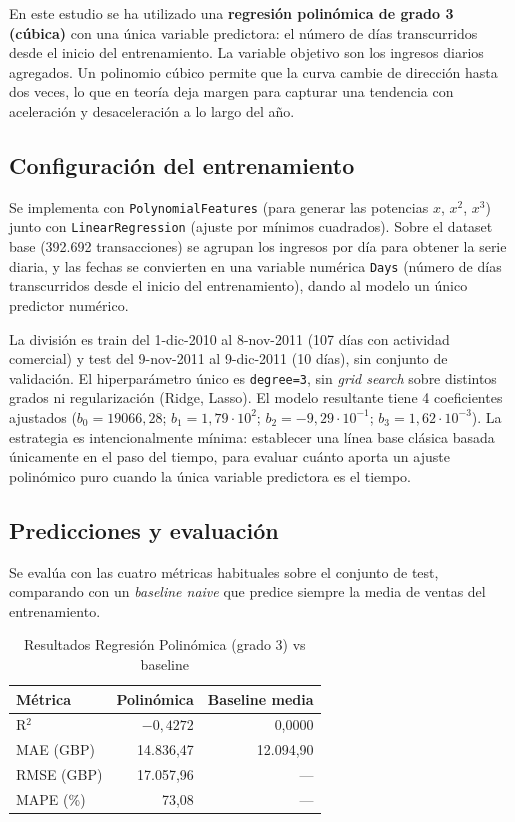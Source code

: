 \documentclass[11pt,a4paper]{article}
\begin{document}
En este estudio se ha utilizado una \textbf{regresión polinómica de grado 3 (cúbica)} con una única variable predictora: el número de días transcurridos desde el inicio del entrenamiento. La variable objetivo son los ingresos diarios agregados. Un polinomio cúbico permite que la curva cambie de dirección hasta dos veces, lo que en teoría deja margen para capturar una tendencia con aceleración y desaceleración a lo largo del año.

\subsection{Configuración del entrenamiento}

Se implementa con \texttt{PolynomialFeatures} (para generar las potencias $x$, $x^2$, $x^3$) junto con \texttt{LinearRegression} (ajuste por mínimos cuadrados). Sobre el dataset base (392.692 transacciones) se agrupan los ingresos por día para obtener la serie diaria, y las fechas se convierten en una variable numérica \texttt{Days} (número de días transcurridos desde el inicio del entrenamiento), dando al modelo un único predictor numérico.

La división es train del 1-dic-2010 al 8-nov-2011 (107 días con actividad comercial) y test del 9-nov-2011 al 9-dic-2011 (10 días), sin conjunto de validación. El hiperparámetro único es \texttt{degree=3}, sin \textit{grid search} sobre distintos grados ni regularización (Ridge, Lasso). El modelo resultante tiene 4 coeficientes ajustados ($b_0 = 19066{,}28$; $b_1 = 1{,}79\cdot10^{2}$; $b_2 = -9{,}29\cdot10^{-1}$; $b_3 = 1{,}62\cdot10^{-3}$). La estrategia es intencionalmente mínima: establecer una línea base clásica basada únicamente en el paso del tiempo, para evaluar cuánto aporta un ajuste polinómico puro cuando la única variable predictora es el tiempo.

\subsection{Predicciones y evaluación}

Se evalúa con las cuatro métricas habituales sobre el conjunto de test, comparando con un \textit{baseline naive} que predice siempre la media de ventas del entrenamiento.

\begin{table}[H]
\centering
\caption{Resultados Regresión Polinómica (grado 3) vs baseline}
\begin{tabular}{lrr}
\toprule
\textbf{Métrica} & \textbf{Polinómica} & \textbf{Baseline media} \\
\midrule
R$^2$ & $-0,4272$ & 0,0000 \\
MAE (GBP) & 14.836,47 & 12.094,90 \\
RMSE (GBP) & 17.057,96 & --- \\
MAPE (\%) & 73,08 & --- \\
\bottomrule
\end{tabular}
\end{table}
\end{document}

